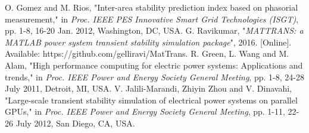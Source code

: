 \begin{thebibliography}{99}
\begin{singlespace}
 O. Gomez and M. Rios, "Inter-area stability prediction index based on phasorial measurement," in \textit{Proc. IEEE PES Innovative Smart Grid Technologies (ISGT)}, pp. 1-8, 16-20 Jan. 2012, Washington, DC, USA.
%
 G. Ravikumar, "\textit{MATTRANS: a MATLAB power system transient stability simulation package}", 2016. [Online]. Available: https://github.com/gelliravi/MatTrans.
%
 R. Green, L. Wang and M. Alam, "High performance computing for electric power systems: Applications and trends," in \textit{Proc. IEEE Power and Energy Society General Meeting}, pp. 1-8, 24-28 July 2011, Detroit, MI, USA.
%
 V. Jalili-Marandi, Zhiyin Zhou and V. Dinavahi, "Large-scale transient stability simulation of electrical power systems on parallel GPUs," in \textit{Proc. IEEE Power and Energy Society General Meeting}, pp. 1-11, 22-26 July 2012, San Diego, CA, USA.
%
%
%
%
%
%
%
%
%
%
%
%
%
%
%
\end{singlespace}

\end{thebibliography}
